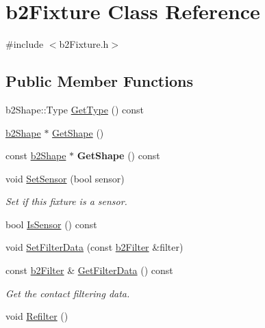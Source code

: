 \hypertarget{classb2_fixture}{}\section{b2\+Fixture Class Reference}
\label{classb2_fixture}


{\ttfamily \#include $<$b2\+Fixture.\+h$>$}

\subsection*{Public Member Functions}
\begin{DoxyCompactItemize}
\item 
b2\+Shape\+::\+Type \hyperlink{classb2_fixture_ab0e1d6bc1c42e6f779e77db408ab2d24}{Get\+Type} () const 
\item 
\hyperlink{classb2_shape}{b2\+Shape} $\ast$ \hyperlink{classb2_fixture_aaa2b73fa212fa53b1c800cccd7a1d31e}{Get\+Shape} ()
\item 
const \hyperlink{classb2_shape}{b2\+Shape} $\ast$ {\bfseries Get\+Shape} () const \hypertarget{classb2_fixture_a5ede102030bd041b07fec5c1f082c8c9}{}\label{classb2_fixture_a5ede102030bd041b07fec5c1f082c8c9}

\item 
void \hyperlink{classb2_fixture_a6198a81dcee0fe814d730383ebfa7038}{Set\+Sensor} (bool sensor)\hypertarget{classb2_fixture_a6198a81dcee0fe814d730383ebfa7038}{}\label{classb2_fixture_a6198a81dcee0fe814d730383ebfa7038}

\begin{DoxyCompactList}\small\item\em Set if this fixture is a sensor. \end{DoxyCompactList}\item 
bool \hyperlink{classb2_fixture_a91758c9dca818ca45f3f6427c7e3fc19}{Is\+Sensor} () const 
\item 
void \hyperlink{classb2_fixture_a2c5e0d12c174927a4ad550459be334ad}{Set\+Filter\+Data} (const \hyperlink{structb2_filter}{b2\+Filter} \&filter)
\item 
const \hyperlink{structb2_filter}{b2\+Filter} \& \hyperlink{classb2_fixture_a5bc271a6e8082e727b053aead1ae86a9}{Get\+Filter\+Data} () const \hypertarget{classb2_fixture_a5bc271a6e8082e727b053aead1ae86a9}{}\label{classb2_fixture_a5bc271a6e8082e727b053aead1ae86a9}

\begin{DoxyCompactList}\small\item\em Get the contact filtering data. \end{DoxyCompactList}\item 
void \hyperlink{classb2_fixture_a45d3320f94811d67383c48466165fa26}{Refilter} ()\hypertarget{classb2_fixture_a45d3320f94811d67383c48466165fa26}{}\label{classb2_fixture_a45d3320f94811d67383c48466165fa26}


\end{DoxyCompactItemize}
